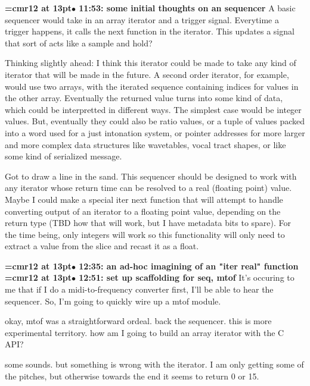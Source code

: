 {\smallskip\noindent\bf\font\titlefont=cmr12 at 13pt\titlefont $\bullet$ 11:53: some initial thoughts on an sequencer}\smallskip
A basic sequencer would take in an array iterator and a trigger signal. Everytime a trigger happens, it calls the next function in the iterator. This updates a signal that sort of acts like a sample and hold?
\par

Thinking slightly ahead: I think this iterator could be made to take any kind of iterator that will be made in the future. A second order iterator, for example, would use two arrays, with the iterated sequence containing indices for values in the other array. Eventually the returned value turns into some kind of data, which could be interpretted in different ways. The simplest case would be integer values. But, eventually they could also be ratio values, or a tuple of values packed into a word used for a just intonation system, or pointer addresses for more larger and more complex data structures like wavetables, vocal tract shapes, or like some kind of serialized message.
\par

Got to draw a line in the sand. This sequencer should be designed to work with any iterator whose return time can be resolved to a real (floating point) value. Maybe I could make a special iter next function that will attempt to handle converting output of an iterator to a floating point value, depending on the return type (TBD how that will work, but I have metadata bits to spare). For the time being, only integers will work so this functionality will only need to extract a value from the slice and recast it as a float.
\par

{\smallskip\noindent\bf\font\titlefont=cmr12 at 13pt\titlefont $\bullet$ 12:35: an ad-hoc imagining of an "iter real" function}\smallskip
{\smallskip\noindent\bf\font\titlefont=cmr12 at 13pt\titlefont $\bullet$ 12:51: set up scaffolding for seq, mtof}\smallskip
It's occuring to me that if I do a midi-to-frequency converter first, I'll be able to hear the sequencer. So, I'm going to quickly wire up a mtof module.
\par

okay, mtof was a straightforward ordeal. back the sequencer. this is more experimental territory. how am I going to build an array iterator with the C API?
\par

some sounds. but something is wrong with the iterator. I am only getting some of the pitches, but otherwise towards the end it seems to return 0 or 15.
\par

